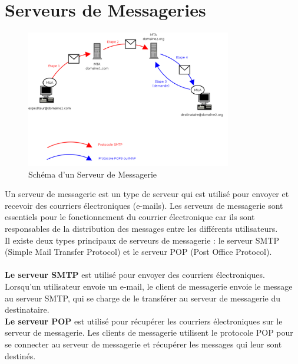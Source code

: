 \section{Serveurs de Messageries} 
	\begin{figure}[h]
		\begin{center}
			
		\includegraphics[width=0.8\textwidth]{PhotoMemoire/Serveur_Messagerie.png}
\caption{Schéma d'un Serveur de Messagerie \cite{7}}
	\end{center}
\end{figure}

Un serveur de messagerie est un type de serveur qui est utilisé pour envoyer et recevoir des courriers électroniques (e-mails). Les serveurs de messagerie sont essentiels pour le fonctionnement du courrier électronique car ils sont responsables de la distribution des messages entre les différents utilisateurs.\\

Il existe deux types principaux de serveurs de messagerie : le serveur SMTP (Simple Mail Transfer Protocol) et le serveur POP (Post Office Protocol).\\
\paragraph{ }
\textbf{Le serveur SMTP} est utilisé pour envoyer des courriers électroniques. Lorsqu'un utilisateur envoie un e-mail, le client de messagerie envoie le message au serveur SMTP, qui se charge de le transférer au serveur de messagerie du destinataire.\\

\textbf{Le serveur POP} est utilisé pour récupérer les courriers électroniques sur le serveur de messagerie. Les clients de messagerie utilisent le protocole POP pour se connecter au serveur de messagerie et récupérer les messages qui leur sont destinés.\\

